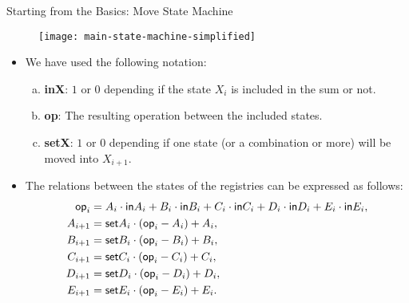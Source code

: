 \begin{frame}[allowframebreaks]{Starting from the Basics: Move State Machine}
\vspace{-0.3cm}
\begin{figure}
	\texttt{[image: main-state-machine-simplified]}
\end{figure}

\begin{itemize}
\item We have used the following notation:
\begin{enumerate}[a)]
\item \textbf{inX}: $1$ or $0$ depending if the state $X_i$ is included in the sum or not.

\item \textbf{op}: The resulting operation between the included states.

\item \textbf{setX}: $1$ or $0$ depending if one state (or a combination or more) will be moved into $X_{i+1}$.
\end{enumerate}
 
\item The relations between the states of the registries can be expressed as follows:
\begin{align*}
\mathsf{op}_i &= A_i \cdot \mathsf{in} A_i + B_i \cdot \mathsf{in} B_i + C_i \cdot \mathsf{in} C_i + D_i \cdot \mathsf{in} D_i + E_i \cdot \mathsf{in} E_i, \\
A_{i+1} &= \mathsf{set} A_i \cdot (\mathsf{op}_i - A_i) + A_i, \\
B_{i+1} &= \mathsf{set} B_i \cdot (\mathsf{op}_i - B_i) + B_i, \\
C_{i+1} &= \mathsf{set} C_i \cdot (\mathsf{op}_i - C_i) + C_i, \\
D_{i+1} &= \mathsf{set} D_i \cdot (\mathsf{op}_i - D_i) + D_i, \\
E_{i+1} &= \mathsf{set} E_i \cdot (\mathsf{op}_i - E_i) + E_i.
\end{align*}
\end{itemize}
\end{frame}




